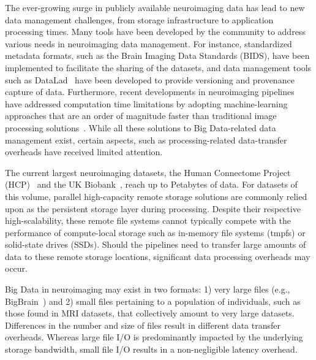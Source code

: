 \documentclass[pdflatex,sn-mathphys-num]{sn-jnl}
\theoremstyle{thmstyleone}%
\theoremstyle{thmstyletwo}%
\theoremstyle{thmstylethree}%
\begin{document}
    The ever-growing surge in publicly available neuroimaging data has lead to new data
    management challenges, from storage infrastructure to application processing times.
    Many tools have been developed by the community to address various needs in 
    neuroimaging data management.
    For instance, standardized metadata formats, such as the Brain Imaging Data Standards (BIDS)\cite{gorgolewski2016brain},
    have been implemented to facilitate the sharing
    of the datasets, and data management tools such as DataLad~\cite{halchenko2021datalad} have been developed to provide 
    versioning and provenance capture of data.
    Furthermore, recent developments in neuroimaging pipelines have addressed computation time 
    limitations by adopting machine-learning approaches that are an order of magnitude faster than traditional image processing solutions~\cite{henschel2020fastsurfer,hoffmann2021synthmorph}.
    While all these solutions to Big Data-related data management exist, certain aspects, 
    such as processing-related data-transfer overheads
    have received limited attention.

    The current largest neuroimaging datasets,
    the Human Connectome Project (HCP)~\cite{HCP} and the UK
    Biobank~\cite{ukbiobank}, reach up to Petabytes of data. For datasets of this
    volume, parallel high-capacity remote storage solutions are commonly relied
    upon as the persistent storage layer during processing. 
    Despite their respective high-scalability, these remote file systems cannot typically
    compete with the performance of compute-local storage such as in-memory file systems (tmpfs) or solid-state drives (SSDs). Should the pipelines 
    need to transfer large amounts of data to these remote storage locations, significant data
    processing overheads may occur.

    Big Data in neuroimaging may exist in two formats: 1) very large files
    (e.g., BigBrain~\cite{amunts2013bigbrain}) and 2) small files pertaining to a
    population of individuals, such as those found in MRI datasets, that
    collectively amount to very large datasets. Differences in the number and
    size of files result in different data transfer overheads. Whereas large
    file I/O is predominantly impacted by the underlying storage bandwidth,
    small file I/O results in a non-negligible latency overhead. 
\end{document}
